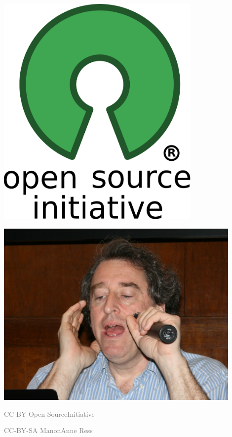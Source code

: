 \documentclass[presentation]{beamer}
\begin{document}
\begin{frame}[label=sec-3-5]{}
\begin{columns}
\begin{column}{0.45\textwidth}
\begin{varblock}[\textwidth]{}
\begin{minipage}[c]{0.5\linewidth}
\includegraphics[width=0.75\textwidth]{images/Opensource}
\end{minipage}\hfill
\begin{minipage}[c]{0.5\linewidth}
\includegraphics[width=0.9\textwidth]{images/Bruce_perens_13jan09_tacd_MAR_1557x1188.JPG}
\end{minipage}
\end{varblock}
\vspace{-0.4cm}
\begin{minipage}[c]{0.5\linewidth}
\tiny \textcolor{gray}{CC-BY Open Source\newline Initiative}
\end{minipage}\hfill
\begin{minipage}[c]{0.5\linewidth}
\tiny \textcolor{gray}{CC-BY-SA Manon\newline Anne Ress}
\end{minipage}
\end{column}
\end{columns}


\end{frame}
\end{document}
